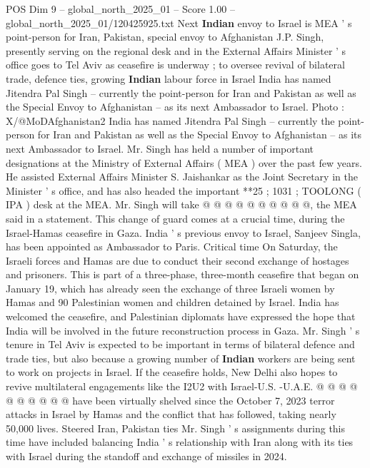 \begin{textsample}{POS Dim 9 – global\_north\_2025\_01 – Score 1.00 – global\_north\_2025\_01/120425925.txt}  \label{ex:f9_pos_421}
Next \textbf{Indian} envoy to Israel is MEA ' s point-person for Iran, Pakistan, special envoy to Afghanistan J.P.
Singh, presently serving on the regional desk and in the External Affairs Minister ' s office goes to Tel Aviv as ceasefire is underway ; to oversee revival of bilateral trade, defence ties, growing \textbf{Indian} labour force in Israel India has named Jitendra Pal Singh -- currently the point-person for Iran and Pakistan as well as the Special Envoy to Afghanistan -- as its next Ambassador to Israel.
Photo : X/@MoDAfghanistan2 India has named Jitendra Pal Singh -- currently the point-person for Iran and Pakistan as well as the Special Envoy to Afghanistan -- as its next Ambassador to Israel.
Mr.
Singh has held a number of important designations at the Ministry of External Affairs ( MEA ) over the past few years.
He assisted External Affairs Minister S.
Jaishankar as the Joint Secretary in the Minister ' s office, and has also headed the important **25 ; 1031 ; TOOLONG ( IPA ) desk at the MEA.
Mr.
Singh will take @ @ @ @ @ @ @ @ @ @, the MEA said in a statement.
This change of guard comes at a crucial time, during the Israel-Hamas ceasefire in Gaza.
India ' s previous envoy to Israel, Sanjeev Singla, has been appointed as Ambassador to Paris.
Critical time On Saturday, the Israeli forces and Hamas are due to conduct their second exchange of hostages and prisoners.
This is part of a three-phase, three-month ceasefire that began on January 19, which has already seen the exchange of three Israeli women by Hamas and 90 Palestinian women and children detained by Israel.
India has welcomed the ceasefire, and Palestinian diplomats have expressed the hope that India will be involved in the future reconstruction process in Gaza.
Mr.
Singh ' s tenure in Tel Aviv is expected to be important in terms of bilateral defence and trade ties, but also because a growing number of \textbf{Indian} workers are being sent to work on projects in Israel.
If the ceasefire holds, New Delhi also hopes to revive multilateral engagements like the I2U2 with Israel-U.S. -U.A.E. @ @ @ @ @ @ @ @ @ @ have been virtually shelved since the October 7, 2023 terror attacks in Israel by Hamas and the conflict that has followed, taking nearly 50,000 lives.
Steered Iran, Pakistan ties Mr.
Singh ' s assignments during this time have included balancing India ' s relationship with Iran along with its ties with Israel during the standoff and exchange of missiles in 2024.

\end{textsample}
